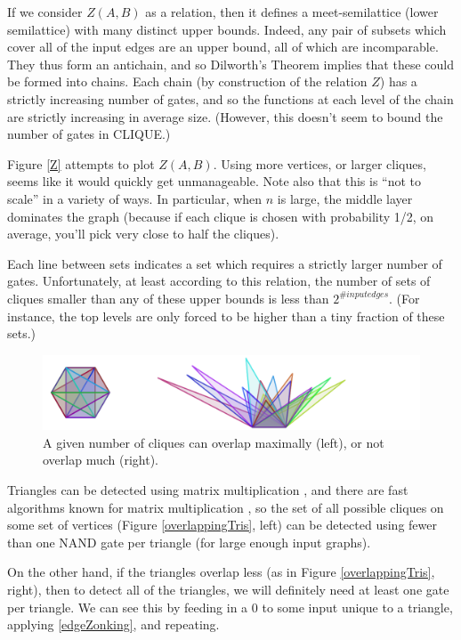 \documentclass[12pt]{article}
\theoremstyle{definition}
\begin{document}
If we consider $Z(A, B)$ as a relation, then it defines a meet-semilattice
(lower semilattice) with 
many distinct upper bounds.  Indeed, any pair of subsets which
cover all of the input edges are an upper bound, all of which
are incomparable. They thus form an antichain, and so Dilworth's Theorem
implies that these could be formed into chains. Each chain (by construction
of the relation $Z$) has a strictly increasing number of gates, and so the
functions at each level of the chain are strictly increasing in average
size. (However, this doesn't seem to bound the number of gates in CLIQUE.)


Figure \ref{Z} attempts to plot $Z(A,B)$. Using more vertices, or
larger cliques, seems like it would quickly get unmanageable.
Note also that this is ``not to scale'' in a variety of ways. In
particular, when $n$ is large, the middle layer dominates the graph
(because if each clique is chosen with probability 1/2, on average,
you'll pick very close to half the cliques).

Each line between sets indicates a set which requires a strictly larger number
of gates.
Unfortunately, at least according to this relation,
the number of sets of cliques smaller than
any of these upper bounds is less than $2^{\# input edges}$.
(For instance, the top levels are only forced to be higher than
a tiny fraction of these sets.)

\begin{figure}
\label{overlappingTris}
\centering
\includegraphics[width=1\textwidth]{R/tri1.pdf}
\caption{A given number of cliques can overlap maximally (left),
or not overlap much (right).}
\label{fig:overlappingTriangles}
\end{figure}

Triangles can be detected using matrix multiplication \cite{itai_finding_1977},
and there are fast algorithms known for matrix multiplication
\cite{strassen_gaussian_1969}
\cite{williams_multiplying_2012}, so the set of all possible
cliques on some set of vertices (Figure \ref{overlappingTris}, left)
 can be detected
using fewer than one NAND gate per triangle (for large enough input graphs).

On the other hand, if the triangles overlap less (as in
Figure \ref{overlappingTris}, right),
then to detect all of the triangles, we will definitely need at least one
gate per triangle. We can see this by feeding in a 0 to some input
unique to a triangle, applying \ref{edgeZonking}, and repeating.
\end{document}
